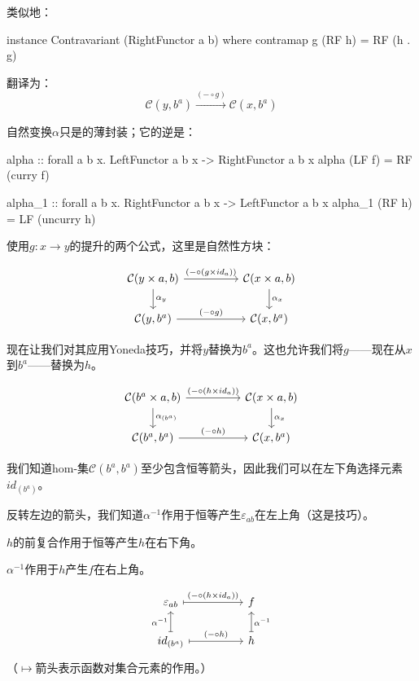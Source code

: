 \documentclass[DaoFP]{subfiles}
\begin{document}
类似地：
\begin{haskell}
instance Contravariant (RightFunctor a b) where
  contramap g (RF h) = RF (h . g)
\end{haskell}
翻译为：
\[  \mathcal{C}(y, b^a) \xrightarrow{ (- \circ g) } \mathcal{C}(x, b^a) \]

自然变换$\alpha$只是的薄封装；它的逆是：

\begin{haskell}
alpha :: forall a b x. LeftFunctor a b x -> RightFunctor a b x
alpha (LF f) = RF (curry f)
\end{haskell}

\begin{haskell}
alpha_1 :: forall a b x. RightFunctor a b x -> LeftFunctor a b x
alpha_1 (RF h) = LF (uncurry h)
\end{haskell}

使用$g \colon x \to y$的提升的两个公式，这里是自然性方块：

\[
 \begin{tikzcd}
 \mathcal{C}(y \times a, b)
 \arrow[rr, "(- \circ (g \times id_a))"]
 \arrow[d,  "\alpha_y"]
& &
\mathcal{C}(x \times a, b)
  \arrow[d, "\alpha_x"]
 \\
 \mathcal{C}(y, b^a)
 \arrow[rr, "(- \circ g)"]
& &
\mathcal{C}(x, b^a)
 \end{tikzcd}
\]

现在让我们对其应用Yoneda技巧，并将$y$替换为$b^a$。这也允许我们将$g$——现在从$x$到$b^a$——替换为$h$。

\[
 \begin{tikzcd}
 \mathcal{C}(b^a \times a, b)
 \arrow[rr, "(- \circ (h \times id_a))"]
 \arrow[d,  "\alpha_{(b^a)}"]
& &
\mathcal{C}(x \times a, b)
  \arrow[d,  "\alpha_x"]
 \\
 \mathcal{C}(b^a, b^a)
 \arrow[rr, "(- \circ h)"]
& &
\mathcal{C}(x, b^a)
 \end{tikzcd}
\]

我们知道hom-集$\mathcal{C}(b^a, b^a)$至少包含恒等箭头，因此我们可以在左下角选择元素$id_{(b^a)}$。

反转左边的箭头，我们知道$\alpha^{-1}$作用于恒等产生$\varepsilon_{a b}$在左上角（这是技巧）。

$h$的前复合作用于恒等产生$h$在右下角。

$\alpha^{-1}$作用于$h$产生$f$在右上角。

\[
 \begin{tikzcd}[
  every arrow/.style={draw,mapsto}
]
 \varepsilon_{a b}
 \arrow[rr, "(- \circ (h \times id_a))"]
& &
f
 \\
 id_{(b^a)}
 \arrow[u, "\alpha^{-1}"]
 \arrow[rr, "(- \circ h)"]
& &
h
\arrow[u, "\alpha^{-1}"']
 \end{tikzcd}
\]
（$\mapsto$箭头表示函数对集合元素的作用。）
\end{document}
